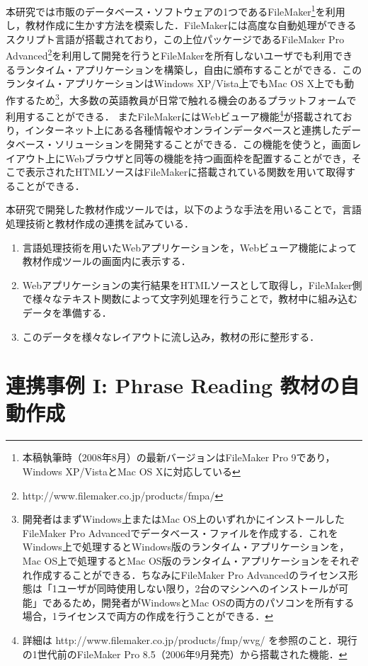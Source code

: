 \documentclass[japanese]{jnlp_1.4}
\begin{document}
本研究では市販のデータベース・ソフトウェアの1つであるFileMaker\footnote{本稿執筆時（2008年8月）の最新バージョンはFileMaker Pro 9であり，Windows XP/VistaとMac OS Xに対応している}を利用し，教材作成に生かす方法を模索した．FileMakerには高度な自動処理ができるスクリプト言語が搭載されており，この上位パッケージであるFileMaker Pro Advanced\footnote{http://www.filemaker.co.jp/products/fmpa/}を利用して開発を行うとFileMakerを所有しないユーザでも利用できるランタイム・アプリケーションを構築し，自由に頒布することができる．このランタイム・アプリケーションはWindows XP/Vista上でもMac OS X上でも動作するため\footnote{開発者はまずWindows上またはMac OS上のいずれかにインストールしたFileMaker Pro Advancedでデータベース・ファイルを作成する．これをWindows上で処理するとWindows版のランタイム・アプリケーションを，Mac OS上で処理するとMac OS版のランタイム・アプリケーションをそれぞれ作成することができる．ちなみにFileMaker Pro Advancedのライセンス形態は「1ユーザが同時使用しない限り，2台のマシンへのインストールが可能」であるため，開発者がWindowsとMac OSの両方のパソコンを所有する場合，1ライセンスで両方の作成を行うことができる．}，大多数の英語教員が日常で触れる機会のあるプラットフォームで利用することができる．
またFileMakerにはWebビューア機能\footnote{詳細は http://www.filemaker.co.jp/products/fmp/wvg/ を参照のこと．現行の1世代前のFileMaker Pro 8.5（2006年9月発売）から搭載された機能．}が搭載されており，インターネット上にある各種情報やオンラインデータベースと連携したデータベース・ソリューションを開発することができる．この機能を使うと，画面レイアウト上にWebブラウザと同等の機能を持つ画面枠を配置することができ，そこで表示されたHTMLソースはFileMakerに搭載されている関数を用いて取得することができる．

本研究で開発した教材作成ツールでは，以下のような手法を用いることで，言語処理技術と教材作成の連携を試みている．

\begin{enumerate}
\item 言語処理技術を用いたWebアプリケーションを，Webビューア機能によって教材作成ツールの画面内に表示する．
\item Webアプリケーションの実行結果をHTMLソースとして取得し，FileMaker側で様々なテキスト関数によって文字列処理を行うことで，教材中に組み込むデータを準備する．
\item このデータを様々なレイアウトに流し込み，教材の形に整形する．
\end{enumerate}



\section{連携事例 I: Phrase Reading 教材の自動作成}
\end{document}
